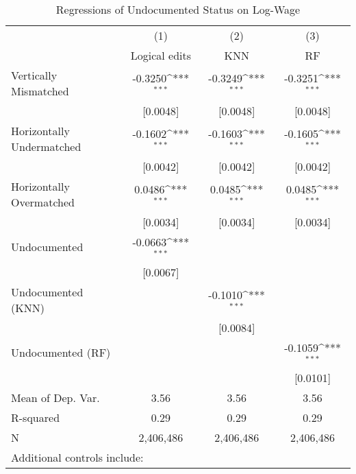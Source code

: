 \begin{table}[htbp]\centering
\def\sym#1{\ifmmode^{#1}\else\(^{#1}\)\fi}
\caption{Regressions of Undocumented Status on Log-Wage}
\begin{tabular}{l*{3}{c}}
\toprule
                    &\multicolumn{1}{c}{(1)}         &\multicolumn{1}{c}{(2)}         &\multicolumn{1}{c}{(3)}         \\
                    &Logical edits         &         KNN         &          RF         \\
\midrule
Vertically Mismatched&     -0.3250\sym{***}&     -0.3249\sym{***}&     -0.3251\sym{***}\\
                    &    [0.0048]         &    [0.0048]         &    [0.0048]         \\
\addlinespace
Horizontally Undermatched&     -0.1602\sym{***}&     -0.1603\sym{***}&     -0.1605\sym{***}\\
                    &    [0.0042]         &    [0.0042]         &    [0.0042]         \\
\addlinespace
Horizontally Overmatched&      0.0486\sym{***}&      0.0485\sym{***}&      0.0485\sym{***}\\
                    &    [0.0034]         &    [0.0034]         &    [0.0034]         \\
\addlinespace
Undocumented        &     -0.0663\sym{***}&                     &                     \\
                    &    [0.0067]         &                     &                     \\
\addlinespace
Undocumented (KNN)  &                     &     -0.1010\sym{***}&                     \\
                    &                     &    [0.0084]         &                     \\
\addlinespace
Undocumented (RF)   &                     &                     &     -0.1059\sym{***}\\
                    &                     &                     &    [0.0101]         \\
\midrule
Mean of Dep. Var.   &        3.56         &        3.56         &        3.56         \\
R-squared           &        0.29         &        0.29         &        0.29         \\
N                   &   2,406,486         &   2,406,486         &   2,406,486         \\
\bottomrule
\multicolumn{4}{l}{\footnotesize Additional controls include:}\\

\end{tabular}
\end{table}
